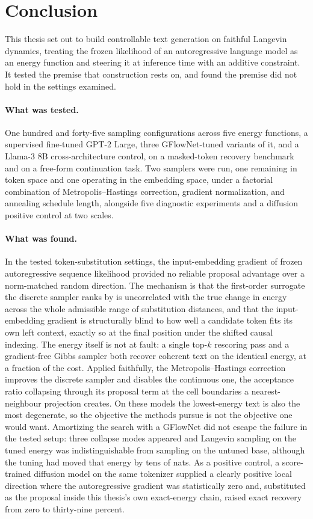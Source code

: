 \section{Conclusion}
\label{ch:conclusion}

This thesis set out to build controllable text generation on faithful Langevin dynamics, treating the frozen likelihood of an autoregressive language model as an energy function and steering it at inference time with an additive constraint. It tested the premise that construction rests on, and found the premise did not hold in the settings examined.

\paragraph*{What was tested.} One hundred and forty-five sampling configurations across five energy functions, a supervised fine-tuned GPT-2 Large, three GFlowNet-tuned variants of it, and a Llama-3 8B cross-architecture control, on a masked-token recovery benchmark and on a free-form continuation task. Two samplers were run, one remaining in token space and one operating in the embedding space, under a factorial combination of Metropolis--Hastings correction, gradient normalization, and annealing schedule length, alongside five diagnostic experiments and a diffusion positive control at two scales.

\paragraph*{What was found.} In the tested token-substitution settings, the input-embedding gradient of frozen autoregressive sequence likelihood provided no reliable proposal advantage over a norm-matched random direction. The mechanism is that the first-order surrogate the discrete sampler ranks by is uncorrelated with the true change in energy across the whole admissible range of substitution distances, and that the input-embedding gradient is structurally blind to how well a candidate token fits its own left context, exactly so at the final position under the shifted causal indexing. The energy itself is not at fault: a single top-$k$ rescoring pass and a gradient-free Gibbs sampler both recover coherent text on the identical energy, at a fraction of the cost. Applied faithfully, the Metropolis--Hastings correction improves the discrete sampler and disables the continuous one, the acceptance ratio collapsing through its proposal term at the cell boundaries a nearest-neighbour projection creates. On these models the lowest-energy text is also the most degenerate, so the objective the methods pursue is not the objective one would want. Amortizing the search with a GFlowNet did not escape the failure in the tested setup: three collapse modes appeared and Langevin sampling on the tuned energy was indistinguishable from sampling on the untuned base, although the tuning had moved that energy by tens of nats. As a positive control, a score-trained diffusion model on the same tokenizer supplied a clearly positive local direction where the autoregressive gradient was statistically zero and, substituted as the proposal inside this thesis's own exact-energy chain, raised exact recovery from zero to thirty-nine percent.

